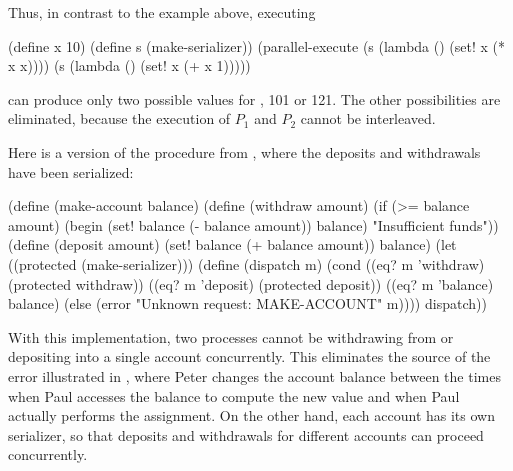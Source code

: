 Thus, in contrast to the example above, executing

\begin{codeBlock}
(define x 10)
(define s (make-serializer))
(parallel-execute
 (s (lambda () (set! x (* x x))))
 (s (lambda () (set! x (+ x 1)))))
\end{codeBlock}

\noindent
can produce only two possible values for , 101 or 121.  The other
possibilities are eliminated, because the execution of \( P_1 \) and \( P_2 \)
cannot be interleaved.

Here is a version of the  procedure from
, where the deposits and withdrawals have been serialized:

\begin{codeBlock}
(define (make-account balance)
  (define (withdraw amount)
    (if (>= balance amount)
        (begin (set! balance (- balance amount))
          balance)
        "Insufficient funds"))
  (define (deposit amount)
    (set! balance (+ balance amount))
    balance)
  (let ((protected (make-serializer)))
    (define (dispatch m)
      (cond ((eq? m 'withdraw) (protected withdraw))
            ((eq? m 'deposit) (protected deposit))
            ((eq? m 'balance) balance)
            (else
              (error "Unknown request: MAKE-ACCOUNT"
                     m))))
    dispatch))
\end{codeBlock}

\noindent
With this implementation, two processes cannot be withdrawing from or
depositing into a single account concurrently.  This eliminates the source of
the error illustrated in , where Peter changes the account
balance between the times when Paul accesses the balance to compute the new
value and when Paul actually performs the assignment.  On the other hand, each
account has its own serializer, so that deposits and withdrawals for different
accounts can proceed concurrently.


